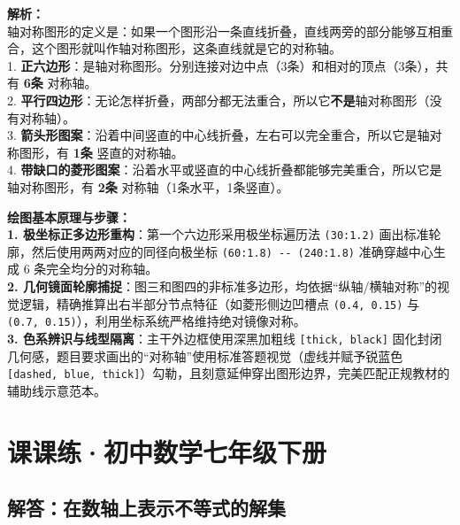 \documentclass[12pt, a4paper]{ctexrep}
\begin{document}
\vspace{0.8cm}

{\small\color{gray}
\textbf{解析：}\\
轴对称图形的定义是：如果一个图形沿一条直线折叠，直线两旁的部分能够互相重合，这个图形就叫作轴对称图形，这条直线就是它的对称轴。\\
1. \textbf{正六边形}：是轴对称图形。分别连接对边中点（3条）和相对的顶点（3条），共有 \textbf{6条} 对称轴。\\
2. \textbf{平行四边形}：无论怎样折叠，两部分都无法重合，所以它\textbf{不是}轴对称图形（没有对称轴）。\\
3. \textbf{箭头形图案}：沿着中间竖直的中心线折叠，左右可以完全重合，所以它是轴对称图形，有 \textbf{1条} 竖直的对称轴。\\
4. \textbf{带缺口的菱形图案}：沿着水平或竖直的中心线折叠都能够完美重合，所以它是轴对称图形，有 \textbf{2条} 对称轴（1条水平，1条竖直）。
}

\vspace{0.6cm}

{\small\color{blue!70!black}
\textbf{绘图基本原理与步骤：}\\
\textbf{1. 极坐标正多边形重构}：第一个六边形采用极坐标遍历法 \texttt{(30:1.2)} 画出标准轮廓，然后使用两两对应的同径向极坐标 \texttt{(60:1.8) -{}- (240:1.8)} 准确穿越中心生成 6 条完全均分的对称轴。\\
\textbf{2. 几何镜面轮廓捕捉}：图三和图四的非标准多边形，均依据“纵轴/横轴对称”的视觉逻辑，精确推算出右半部分节点特征（如菱形侧边凹槽点 \texttt{(0.4, 0.15)} 与 \texttt{(0.7, 0.15)}），利用坐标系统严格维持绝对镜像对称。\\
\textbf{3. 色系辨识与线型隔离}：主干外边框使用深黑加粗线 \texttt{[thick, black]} 固化封闭几何感，题目要求画出的“对称轴”使用标准答题视觉（虚线并赋予锐蓝色 \texttt{[dashed, blue, thick]}）勾勒，且刻意延伸穿出图形边界，完美匹配正规教材的辅助线示意范本。
}



\chapter{课课练·初中数学七年级下册}

\vspace{0.8cm}

\section{解答：在数轴上表示不等式的解集}

\vspace{0.4cm}
\end{document}
